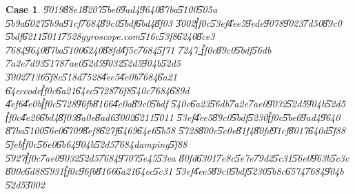 \documentclass[12pt,a4paper]{article}
\newtheorem{case}[theorem]{Case}
\begin{document}
\begin{case}
\U{9019}\U{88e1}\U{8207}\U{5be6}\U{9ad4}\U{9640}\U{87ba}\U{5100}\U{505a}%
\U{5b9a}\U{6027}\U{5b9a}\U{91cf}\U{7684}\U{89c0}\U{5bdf}\U{6bd4}\U{8f03}%
\U{3002}\U{ff0c}\U{53ef}\U{4ee5}\U{9ede}\U{9078}\U{9023}\U{7d50}\U{89c0}%
\U{5bdf}\U{6211}\U{5011}\U{7528}gyroscope.com\U{516c}\U{53f8}\U{6240}\U{8ce3}%
\U{7684}\U{9640}\U{87ba}\U{5100}\U{6240}\U{88fd}\U{4f5c}\U{7684}\U{5f71}%
\U{7247}\href{http://tinypic.com/r/2clcee/8}{\underline{\color{blue}%
}}\U{ff0c}\U{89c0}\U{5bdf}\U{56db}%
\U{7a2e}\U{7d93}\U{5178}\U{7ae0}\U{52d5}\U{9032}\U{52d5}\U{904b}\U{52d5}%
\U{3002}\U{7136}\U{5f8c}\U{518d}\U{7528}\U{4ee5}\U{4e0b}\U{7684}\U{6a21}%
\U{64ec}code\U{ff0c}\U{6a21}\U{64ec}\U{5728}\U{76f8}\U{540c}\U{7684}\U{689d}%
\U{4ef6}\U{4e0b}\U{ff0c}\U{5728}\U{96fb}\U{8166}\U{4e0a}\U{89c0}\U{5bdf}%
\U{540c}\U{6a23}\U{56db}\U{7a2e}\U{7ae0}\U{9032}\U{52d5}\U{904b}\U{52d5}%
\U{ff0c}\U{4e26}\U{6bd4}\U{8f03}\U{8a0e}\U{8ad6}\U{3002}\U{6211}\U{5011}%
\U{53ef}\U{4ee5}\U{89c0}\U{5bdf}\U{5230}\U{ff0c}\U{5be6}\U{9ad4}\U{9640}%
\U{87ba}\U{5100}\U{56e0}\U{6709}\U{8ef8}\U{627f}\U{6469}\U{64e6}\U{5b58}%
\U{5728}\U{800c}\U{5c0e}\U{81f4}\U{80fd}\U{91cf}\U{8017}\U{640d}\U{5f88}%
\U{5feb}\U{ff0c}\U{56e0}\U{6b64}\U{904b}\U{52d5}\U{7684}damping\U{5f88}%
\U{5927}\U{ff0c}\U{7ae0}\U{9032}\U{52d5}\U{7684}\U{9707}\U{5e45}\U{53ea}%
\U{80fd}\U{6301}\U{7e8c}\U{5e7e}\U{79d2}\U{5c31}\U{56e0}\U{963b}\U{5c3c}%
\U{800c}\U{6d88}\U{5931}\U{ff0c}\U{96fb}\U{8166}\U{6a21}\U{64ec}\U{5c31}%
\U{53ef}\U{4ee5}\U{89c0}\U{5bdf}\U{5230}\U{5b8c}\U{6574}\U{7684}\U{904b}%
\U{52d5}\U{3002}
\end{case}

%
\end{document}
